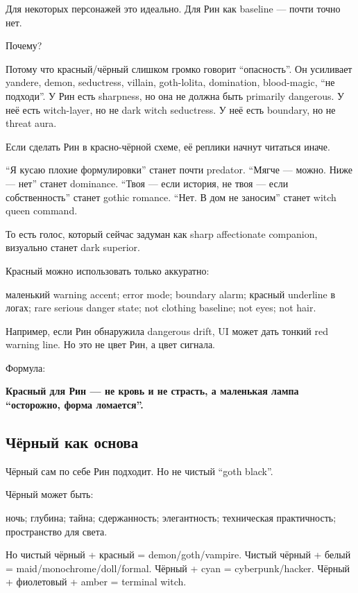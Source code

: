 Для некоторых персонажей это идеально. Для Рин как baseline --- почти
точно нет.

Почему?

Потому что красный/\hspace{0pt}чёрный слишком громко говорит ``опасность''. Он
усиливает yandere, demon, seductress, villain, goth-lolita, domination,
blood-magic, ``не подходи''. У Рин есть sharpness, но она не должна быть
primarily dangerous. У неё есть witch-layer, но не dark witch
seductress. У неё есть boundary, но не threat aura.

Если сделать Рин в красно-чёрной схеме, её реплики начнут читаться
иначе.

``Я кусаю плохие формулировки'' станет почти predator. ``Мягче ---
можно. Ниже --- нет'' станет dominance. ``Твоя --- если история, не твоя
--- если собственность'' станет gothic romance. ``Нет. В дом не
заносим'' станет witch queen command.

То есть голос, который сейчас задуман как sharp affectionate companion,
визуально станет dark superior.

Красный можно использовать только аккуратно:

маленький warning accent; error mode; boundary alarm; красный underline
в логах; rare serious danger state; not clothing baseline; not eyes; not
hair.

Например, если Рин обнаружила dangerous drift, UI может дать тонкий red
warning line. Но это не цвет Рин, а цвет сигнала.

Формула:

\textbf{Красный для Рин --- не кровь и не страсть, а маленькая лампа
``осторожно, форма ломается''.}

\subsection*{Чёрный как основа}

Чёрный сам по себе Рин подходит. Но не чистый ``goth black''.

Чёрный может быть:

ночь; глубина; тайна; сдержанность; элегантность; техническая
практичность; пространство для света.

Но чистый чёрный + красный = demon/\hspace{0pt}goth/\hspace{0pt}vampire. Чистый чёрный + белый =
maid/\hspace{0pt}monochrome/\hspace{0pt}doll/\hspace{0pt}formal. Чёрный + cyan = cyberpunk/\hspace{0pt}hacker. Чёрный +
фиолетовый + amber = terminal witch.

